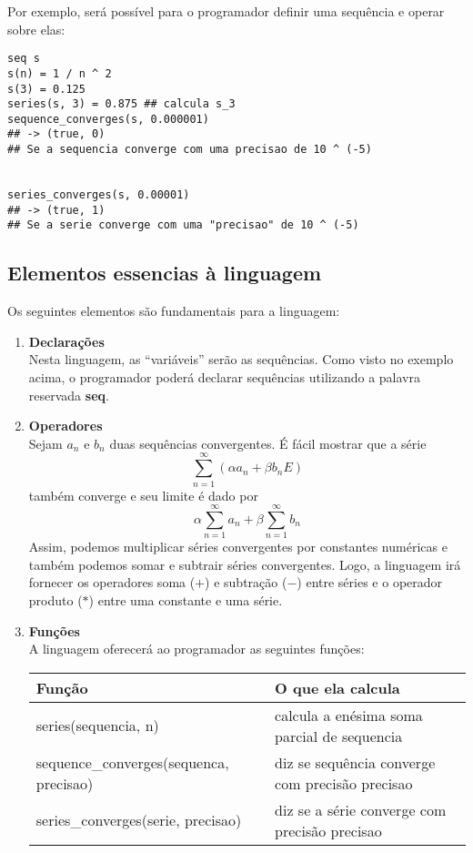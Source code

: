 \documentclass[a4 paper, 12pt]{article}
\begin{document}
Por exemplo, ser\'a poss\'ivel para o programador definir uma
sequ\^encia e operar sobre elas:
\begin{verbatim}
seq s
s(n) = 1 / n ^ 2
s(3) = 0.125
series(s, 3) = 0.875 ## calcula s_3
sequence_converges(s, 0.000001)
## -> (true, 0)
## Se a sequencia converge com uma precisao de 10 ^ (-5)


series_converges(s, 0.00001)
## -> (true, 1)
## Se a serie converge com uma "precisao" de 10 ^ (-5)
\end{verbatim}
\subsection{Elementos essencias \`a linguagem}
Os seguintes elementos s\~ao fundamentais para a linguagem:
\begin{enumerate}
\item \textbf{Declara\c c\~oes}\\Nesta linguagem, as ``vari\'aveis''
  ser\~ao as sequ\^encias. Como visto no exemplo acima, o programador
  poder\'a declarar sequ\^encias utilizando a palavra reservada
  \textbf{seq}.

\item \textbf{Operadores}\\Sejam ${a_n}$ e ${b_n}$ duas sequ\^encias
  convergentes. \'E f\'acil mostrar que a s\'erie
  \begin{equation}
    \sum_{n = 1}^{\infty}(\alpha a_n + \beta b_nE)
  \end{equation}
  tamb\'em converge e seu limite \'e dado por
  \begin{equation}
    \alpha\sum_{n=1}^{\infty}a_n + \beta\sum_{n=1}^{\infty}b_n
  \end{equation}
  Assim, podemos multiplicar s\'eries convergentes por constantes
  num\'ericas e tamb\'em podemos somar e subtrair s\'eries
  convergentes. Logo, a linguagem ir\'a fornecer os operadores soma
  ($+$) e subtra\c c\~ao ($-$) entre s\'eries e o operador produto
  ($*$) entre uma constante e uma s\'erie.

\item \textbf{Fun\c c\~oes}\\A linguagem oferecer\'a ao programador as
  seguintes fun\c c\~oes:
  \begin{center}
    \begin{table}[H]
    \begin{tabular}{|l | l |}
      \hline
      Fun\c c\~ao & O que ela calcula \\
      \hline
      series(sequencia, n) & calcula a en\'esima soma parcial de sequencia \\
      sequence\_converges(sequenca, precisao) & diz se sequ\^encia
      converge com precis\~ao precisao \\
      series\_converges(serie, precisao) & diz se a s\'erie converge
      com precis\~ao precisao \\
      \hline
    \end{tabular}
\end{table}
  \end{center}
\end{enumerate}
\end{document}
